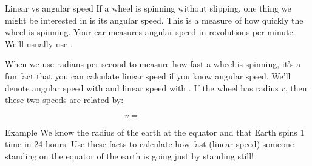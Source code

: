 \documentclass[presentation]{beamer}
\begin{document}
\begin{frame}[label={sec:org25ca001}]{Linear vs angular speed}
If a wheel is spinning without slipping, one thing we might be interested in is its
\alert{angular speed}.  This is a measure of how quickly the wheel is spinning.  Your car
measures angular speed in revolutions per minute.  We'll usually use \uline{\hspace*{1in}}.

When we use radians per second to measure how fast a wheel is
spinning, it's a fun fact that you can calculate linear speed if you
know angular speed.  We'll denote angular speed with \uline{\hspace*{1in}}
and linear speed with \uline{\hspace*{1in}}.  If the wheel has radius \(r\), then
these two speeds are related by:

\[ v = \hspace{1in}\]
\end{frame}

\begin{frame}[label={sec:orgc93ab33}]{Example}
We know the radius of the earth at the equator and that Earth spins 1
time in 24 hours. Use these facts to calculate how fast (linear speed) someone
standing on the equator of the earth is going just by standing still!

\vspace{10in}
\end{frame}
\end{document}
